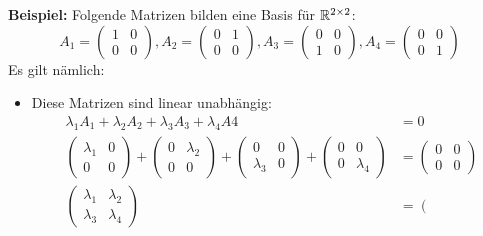 \textbf{Beispiel:} Folgende Matrizen bilden eine Basis für $\mathbb{R}^{2 \times 2}$:
\[A_1 = \left(
\begin{array}{cc}
    1 & 0 \\ 0 & 0
\end{array}
\right), A_2 = \left(
\begin{array}{cc}
    0 & 1 \\ 0 & 0
\end{array}
\right), A_3 = \left(
\begin{array}{cc}
    0 & 0 \\ 1 & 0
\end{array}
\right), A_4 = \left(
\begin{array}{cc}
    0 & 0 \\ 0 & 1
\end{array}
\right)\]
Es gilt nämlich:
\begin{itemize}
    \item Diese Matrizen sind linear unabhängig:
    \begin{align*}
        \lambda_1 A_1 + \lambda_2 A_2 + \lambda_3 A_3 + \lambda_4 A4 &= 0 \\
        \left(
        \begin{array}{cc}
            \lambda_1 & 0 \\ 0 & 0
        \end{array}
        \right) + \left(
        \begin{array}{cc}
            0 & \lambda_2 \\ 0 & 0
        \end{array}
        \right) + \left(
        \begin{array}{cc}
            0 & 0 \\ \lambda_3 & 0
        \end{array}
        \right) + \left(
        \begin{array}{cc}
            0 & 0 \\ 0 & \lambda_4
        \end{array}
        \right) &= \left(
        \begin{array}{cc}
            0 & 0 \\ 0 & 0
        \end{array}
        \right) \\
        \left(
        \begin{array}{cc}
            \lambda_1 & \lambda_2 \\ \lambda_3 & \lambda_4
        \end{array}
        \right) &= \left(

\end{align*}
\end{itemize}
